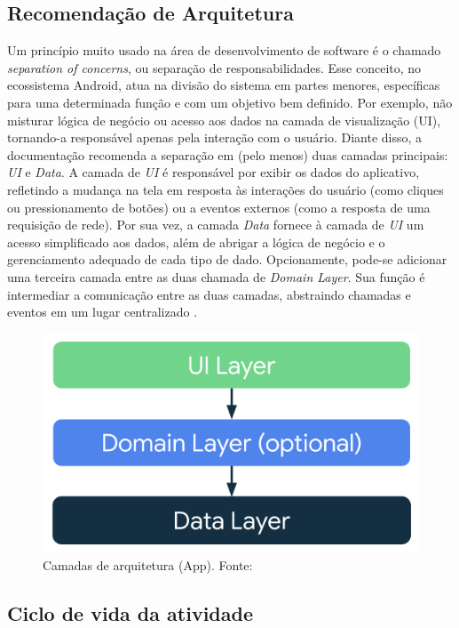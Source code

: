 \subsection{Recomendação de Arquitetura}

Um princípio muito usado na área de desenvolvimento de software é o chamado \textit{separation of concerns}, ou separação de responsabilidades. Esse conceito, no ecossistema Android,
atua na divisão do sistema em partes menores, específicas para uma determinada função e com um objetivo bem definido. Por exemplo, não misturar lógica de 
negócio ou acesso aos dados na camada de visualização (UI), tornando-a  responsável apenas pela interação com o usuário. Diante disso, a documentação recomenda a separação em (pelo menos)
duas camadas principais: \textit{UI} e \textit{Data}. A camada de \textit{UI} é responsável por exibir os dados do aplicativo, refletindo a mudança na tela em resposta às
interações do usuário (como cliques ou pressionamento de botões) ou a eventos externos (como a resposta de uma requisição de rede). Por sua vez, a camada \textit{Data} fornece à camada de \textit{UI} 
um acesso simplificado aos dados, além de abrigar a lógica de negócio e o gerenciamento adequado de cada tipo de dado. Opcionamente, pode-se adicionar uma terceira camada entre as duas chamada de \textit{Domain Layer}.
Sua função é intermediar a comunicação entre as duas camadas, abstraindo chamadas e eventos em um lugar centralizado \cite{google-developers-guideline}.

\begin{figure}[ht]
    \centering
    \includegraphics[width=.73\textwidth]{img/app-android-layers.png}
    \caption{Camadas de arquitetura (App). Fonte:\cite{google-developers-guideline}}\label{figAppLayer}
\end{figure}

\subsection{Ciclo de vida da atividade}\label{ciclo-de-vida}

